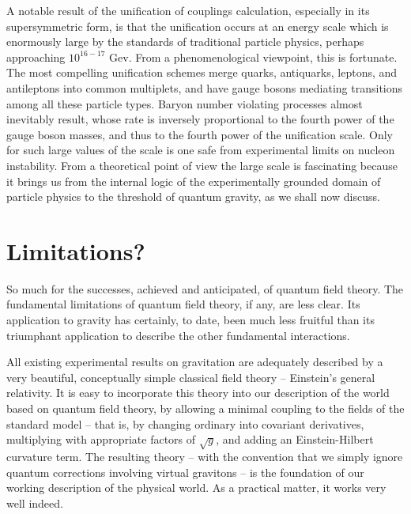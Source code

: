 \documentclass[12pt]{article}
\begin{document}
A notable result of the unification of couplings calculation,
especially in its supersymmetric form, is that the unification occurs
at an energy scale which is enormously large by the standards of
traditional particle physics, perhaps approaching $10^{16-17}$ Gev.
{}From a phenomenological viewpoint, this is fortunate.  The most
compelling unification schemes merge quarks, antiquarks, leptons, and
antileptons into common multiplets, and have gauge bosons mediating
transitions among all these particle types.  Baryon number violating
processes almost inevitably result, whose rate is inversely
proportional to the fourth power of the gauge boson masses, and thus
to the fourth power of the unification scale.  Only for such large
values of the scale is one safe from experimental limits on nucleon
instability.  From a theoretical point of view the large scale is
fascinating because it brings us from the internal logic of the
experimentally grounded domain of particle physics to the threshold of
quantum gravity, as we shall now discuss.





\section{Limitations?}


So much for the successes, achieved and anticipated, of quantum field
theory.  The fundamental limitations of quantum field theory, if any,
are less clear.  Its application to gravity has certainly, to date,
been much less fruitful than its triumphant application to describe
the other fundamental interactions.   

All existing experimental
results on gravitation are adequately described by a very beautiful,
conceptually simple classical field  theory -- Einstein's general
relativity.  It is easy to incorporate this  theory into our
description of the  world based on quantum field theory, by allowing a
minimal coupling to the fields of the standard model -- that is, by
changing ordinary into covariant derivatives, multiplying with
appropriate factors of $\sqrt g$, and adding an Einstein-Hilbert
curvature term.   
The resulting theory --  with the convention that we
simply ignore quantum corrections involving virtual gravitons -- is
the foundation of our working description of the physical world.  As a
practical matter, it works very well indeed.    
\end{document}
